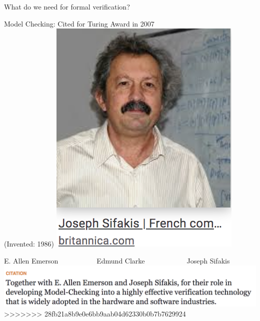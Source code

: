 \documentclass{beamer}
\begin{document}
\begin{frame}{What do we need for formal verification?}
\begin{frame}{Model Checking: Cited for Turing Award in 2007 \\
(Invented: 1986)}
\includegraphics[scale=0.4]{pics/sifakis.png}

E. Allen Emerson~~~~~~~~~~~Edmund Clarke~~~~~~~~~~~~Joseph Sifakis
\includegraphics[scale=0.5]{pics/Citation.png} 
>>>>>>> 28fb21a8b9e0e6bb9aab04d62330b0b7b7629924
\end{frame}


\end{frame}
\end{document}
